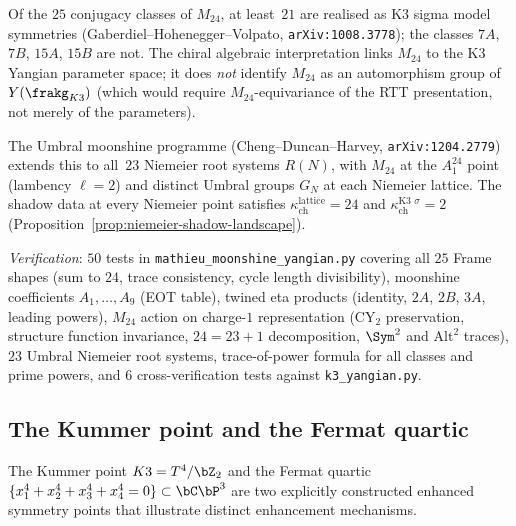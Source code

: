 \begin{conjecture}
Of the $25$ conjugacy classes of $M_{24}$, at least~$21$ are realised as
K3 sigma model symmetries (Gaberdiel--Hohenegger--Volpato,
\texttt{arXiv:1008.3778}); the classes $7A$, $7B$, $15A$, $15B$ are not.
The chiral algebraic interpretation links $M_{24}$ to the K3 Yangian
parameter space; it does \emph{not} identify $M_{24}$ as an automorphism
group of $Y(\frakg_{K3})$ (which would require $M_{24}$-equivariance of
the RTT presentation, not merely of the parameters).

The Umbral moonshine programme (Cheng--Duncan--Harvey,
\texttt{arXiv:1204.2779}) extends this to all~$23$ Niemeier root
systems $R(N)$, with $M_{24}$ at the $A_1^{24}$ point (lambency $\ell = 2$)
and distinct Umbral groups $G_N$ at each Niemeier lattice.  The shadow
data at every Niemeier point satisfies
$\kappa_{\mathrm{ch}}^{\text{lattice}} = 24$ and
$\kappa_{\mathrm{ch}}^{\text{K3 }\sigma} = 2$
(Proposition~\ref{prop:niemeier-shadow-landscape}).
\end{conjecture}

\noindent\textit{Verification}: $50$ tests in
\texttt{mathieu\_moonshine\_yangian.py} covering all $25$ Frame shapes
(sum to $24$, trace consistency, cycle length divisibility), moonshine
coefficients $A_1, \ldots, A_9$ (EOT table), twined eta products (identity,
$2A$, $2B$, $3A$, leading powers), $M_{24}$ action on charge-$1$
representation (CY$_2$ preservation, structure function invariance,
$24 = 23 + 1$ decomposition, $\Sym^2$ and $\mathrm{Alt}^2$ traces),
$23$ Umbral Niemeier root systems, trace-of-power formula for all
classes and prime powers, and $6$ cross-verification tests against
\texttt{k3\_yangian.py}.

\subsection{The Kummer point and the Fermat quartic}
\label{subsec:k3-kummer-fermat-enhancement}

The Kummer point $K3 = T^4/\bZ_2$ and the Fermat quartic
$\{x_1^4 + x_2^4 + x_3^4 + x_4^4 = 0\} \subset \bC\bP^3$
are two explicitly constructed enhanced symmetry points that
illustrate distinct enhancement mechanisms.

